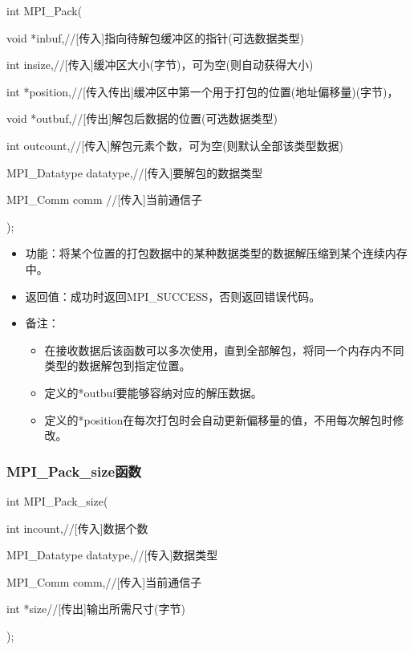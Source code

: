 \documentclass[UTF8]{article}%
\begin{document}
int MPI\_Pack(

    \qquad void            *inbuf,//[传入]指向待解包缓冲区的指针(可选数据类型) 

    \qquad int             insize,//[传入]缓冲区大小(字节)，可为空(则自动获得大小)

    \qquad int             *position,//[传入传出]缓冲区中第一个用于打包的位置(地址偏移量)(字节)，

    \qquad void            *outbuf,//[传出]解包后数据的位置(可选数据类型) 

    \qquad int             outcount,//[传入]解包元素个数，可为空(则默认全部该类型数据)

    \qquad MPI\_Datatype   datatype,//[传入]要解包的数据类型

    \qquad MPI\_Comm       comm //[传入]当前通信子
    
);

\begin{itemize}
    \item 功能：将某个位置的打包数据中的某种数据类型的数据解压缩到某个连续内存中。
    \item 返回值：成功时返回MPI\_SUCCESS，否则返回错误代码。
    \item 备注：
    
    {
        \begin{itemize}
            \item 在接收数据后该函数可以多次使用，直到全部解包，将同一个内存内不同类型的数据解包到指定位置。
            \item 定义的*outbuf要能够容纳对应的解压数据。
            \item 定义的*position在每次打包时会自动更新偏移量的值，不用每次解包时修改。
        \end{itemize}
    }
\end{itemize}

\subsubsection{MPI\_Pack\_size函数}

int MPI\_Pack\_size(

    \qquad int           incount,//[传入]数据个数

    \qquad MPI\_Datatype datatype,//[传入]数据类型

    \qquad MPI\_Comm     comm,//[传入]当前通信子

    \qquad int           *size//[传出]输出所需尺寸(字节)

);
\end{document}
